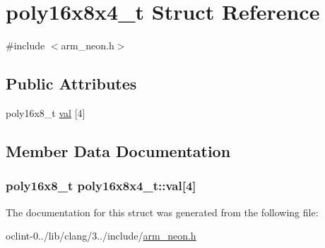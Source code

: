 \hypertarget{structpoly16x8x4__t}{\section{poly16x8x4\-\_\-t Struct Reference}
\label{structpoly16x8x4__t}
}


{\ttfamily \#include $<$arm\-\_\-neon.\-h$>$}

\subsection*{Public Attributes}
\begin{DoxyCompactItemize}
\item 
poly16x8\-\_\-t \hyperlink{structpoly16x8x4__t_aa60670d2daf6e8a21fb5c54482ecb720}{val} \mbox{[}4\mbox{]}
\end{DoxyCompactItemize}


\subsection{Member Data Documentation}
\hypertarget{structpoly16x8x4__t_aa60670d2daf6e8a21fb5c54482ecb720}{
\subsubsection[{val}]{\setlength{\rightskip}{0pt plus 5cm}poly16x8\-\_\-t poly16x8x4\-\_\-t\-::val\mbox{[}4\mbox{]}}}\label{structpoly16x8x4__t_aa60670d2daf6e8a21fb5c54482ecb720}


The documentation for this struct was generated from the following file\-:\begin{DoxyCompactItemize}
\item 
oclint-\/0../lib/clang/3../include/\hyperlink{arm__neon_8h}{arm\-\_\-neon.\-h}\end{DoxyCompactItemize}
